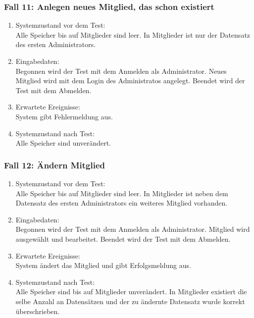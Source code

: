\subsubsection{Fall 11: Anlegen neues Mitglied, das schon existiert}
\begin{enumerate}
\item Systemzustand vor dem Test:\\
	Alle Speicher bis auf Mitglieder sind leer. In Mitglieder ist nur der Datensatz des ersten Administrators.
\item Eingabedaten:\\
	Begonnen wird der Test mit dem Anmelden als Administrator. Neues Mitglied wird mit dem Login des Administratos angelegt. Beendet wird der Test mit dem Abmelden.
\item Erwartete Ereignisse:\\
	System gibt Fehlermeldung aus.
\item Systemzustand nach Test:\\
	Alle Speicher sind unverändert.
\end{enumerate}

\subsubsection{Fall 12: Ändern Mitglied}
\begin{enumerate}
\item Systemzustand vor dem Test:\\
	Alle Speicher bis auf Mitglieder sind leer. In Mitglieder ist neben dem Datensatz des ersten Administrators ein weiteres Mitglied vorhanden.
\item Eingabedaten:\\
	Begonnen wird der Test mit dem Anmelden als Administrator. Mitglied wird ausgewählt und bearbeitet. Beendet wird der Test mit dem Abmelden.
\item Erwartete Ereignisse:\\
	System ändert das Mitglied und gibt Erfolgsmeldung aus.
\item Systemzustand nach Test:\\
	Alle Speicher sind bis auf Mitglieder unverändert. In Mitglieder existiert die selbe Anzahl an Datensätzen und der zu ändernte Datensatz wurde korrekt überschrieben.
\end{enumerate}

